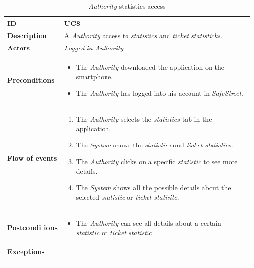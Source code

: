 \documentclass {article}
\begin{document}
	\begin{longtable}{| p{3 cm} | p{10.5 cm} |} 
			\hline
			{\bf ID} & UC8 \\
			\hline
			{\bf Description} & A {\it Authority} access to {\it statistics} and {\it ticket statisticks}.\\
			\hline
			{\bf Actors} & {\it Logged-in Authority}\\
			\hline
			{\bf Preconditions} & 	
			\begin{itemize}
				\item The {\it Authority} downloaded the application on the smartphone.
				\item The {\it Authority} has logged into his account in {\it SafeStreet}.
			\end{itemize}
			\\
			\hline
			{\bf Flow of events} &	
			\begin{enumerate}
				\item The {\it Authority} selects the {\it statistics} tab in the application.
				\item The {\it System} shows the {\it statistics} and {\it ticket statistics}.
				\item The {\it Authority} clicks on a specific {\it statistic} to see more details. 
				\item The {\it System} shows all the possible details about the selected {\it statistic} or {\it ticket statisitc}. 
			\end{enumerate}
			\\
			\hline
			{\bf Postconditions} & 
			\begin{itemize}
				\item The {\it Authority} can see all details about a certain {\it statistic} or {\it ticket statistic}
			\end{itemize}
			\\
			\hline
			{\bf Exceptions} & 	
			\\ \\
			\hline
			\caption{{\it Authority} statistics access}
			\end{longtable}
			
\end{document}
